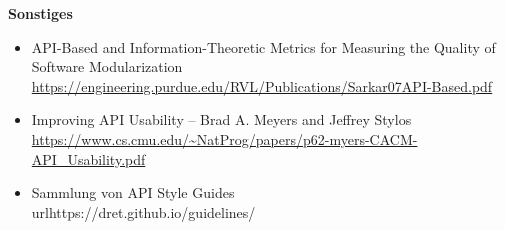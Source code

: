 \documentclass[../../expose]{subfiles}
\begin{document}
\textbf{Sonstiges}
\begin{itemize}
\item API-Based and Information-Theoretic Metrics for Measuring the Quality of Software Modularization \\ \url{https://engineering.purdue.edu/RVL/Publications/Sarkar07API-Based.pdf }
\item Improving API Usability – Brad A. Meyers and Jeffrey Stylos \\ \url{https://www.cs.cmu.edu/~NatProg/papers/p62-myers-CACM-API_Usability.pdf}
\item Sammlung von API Style Guides \\ url{https://dret.github.io/guidelines/}
\end{itemize}
\end{document}
